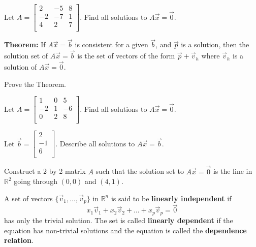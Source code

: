 \documentclass[12pt,letterpaper]{article}
\begin{document}
\begin{enumerate}

\Problem  Let $A=\begin{bmatrix} 2 & -5 & 8\\ -2 & -7 & 1\\ 4& 2 & 7\\ \end{bmatrix}$. Find all solutions to $A\vec{x} = \vec{0}$.

\newpage

{\bf Theorem:} If $A\vec{x} =\vec{b}$ is consistent for a given $\vec{b}$, and $\vec{p}$ is a solution, then the solution set of $A\vec{x}=\vec{b}$ is the set of vectors of the form $\vec{p}+\vec{v}_h$ where $\vec{v}_h$ is a solution of $A\vec{x} =\vec{0}$.

\Problem Prove the Theorem.

\newpage

\Problem Let $A=\begin{bmatrix} 1 & 0 & 5\\ -2 & 1 & -6\\ 0 & 2 & 8\\ \end{bmatrix}$. 
\Part Find all solutions to $A\vec{x} = \vec{0}$.

\vfill

\Part Let $\vec{b}=\begin{bmatrix} 2\\-1\\6\\\end{bmatrix}$. Describe all solutions to $A\vec{x} =\vec{b}$.

\vfill

\Problem Construct a 2 by 2 matrix $A$ such that the solution set to $A\vec{x}=\vec{0}$ is the line in $\mathbb{R}^2$ going through $(0,0)$ and $(4,1)$.

\vfill


\newpage

\begin{defn}
A set of vectors $\{ \vec{v}_1, \dots, \vec{v}_p\}$ in $\mathbb{R}^n$ is said to be {\bf linearly independent} if $$x_1 \vec{v}_1 +x_2 \vec{v}_2 +\dots +x_p \vec{v}_p = \vec{0}$$ has only the trivial solution. The set is called {\bf linearly dependent} if the equation has non-trivial solutions and the equation is called the {\bf dependence relation}.
\end{defn}


\end{enumerate}
\end{document}
